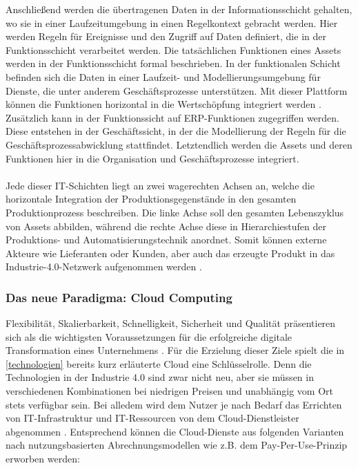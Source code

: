 Anschließend werden die übertragenen Daten in der Informationsschicht gehalten, wo sie in einer Laufzeitumgebung in einen Regelkontext gebracht werden. Hier werden Regeln für Ereignisse und den Zugriff auf Daten definiert, die in der Funktionsschicht verarbeitet werden. Die tatsächlichen Funktionen eines Assets werden in der Funktionsschicht formal beschrieben. In der funktionalen Schicht befinden sich die Daten in einer Laufzeit- und Modellierungsumgebung für Dienste, die unter anderem Geschäftsprozesse unterstützen. Mit dieser Plattform können die Funktionen horizontal in die Wertschöpfung integriert werden \citep{Huebner2017}. Zusätzlich kann in der Funktionssicht auf ERP-Funktionen zugegriffen werden. Diese entstehen in der Geschäftssicht, in der die Modellierung der Regeln für die Geschäftsprozessabwicklung stattfindet. Letztendlich werden die Assets und deren Funktionen hier in die Organisation und Geschäftsprozesse integriert.
\\\\
Jede dieser IT-Schichten liegt an zwei wagerechten Achsen an, welche die horizontale Integration der Produktionsgegenstände in den gesamten Produktionprozess beschreiben. Die linke Achse soll den gesamten Lebenszyklus von Assets abbilden, während die rechte Achse diese in Hierarchiestufen der Produktions- und Automatisierungstechnik anordnet. Somit können externe Akteure wie Lieferanten oder Kunden, aber auch das erzeugte Produkt in das Industrie-4.0-Netzwerk aufgenommen werden \citep{BITKOM2015}.


\subsubsection{Das neue Paradigma: Cloud Computing} \label{cloud}

Flexibilität, Skalierbarkeit, Schnelligkeit, Sicherheit und Qualität präsentieren sich als die wichtigsten Voraussetzungen für die erfolgreiche digitale Transformation eines Unternehmens \citep{Acharya2019}. Für die Erzielung dieser Ziele spielt die in \ref{technologien} bereits kurz erläuterte Cloud eine Schlüsselrolle. Denn die Technologien in der Industrie 4.0 sind zwar nicht neu, aber sie müssen in verschiedenen Kombinationen bei niedrigen Preisen und unabhängig vom Ort stets verfügbar sein. Bei alledem wird dem Nutzer je nach Bedarf das Errichten von IT-Infrastruktur und IT-Ressourcen von dem Cloud-Dienstleister abgenommen \citep{Dzombeta2017}. Entsprechend können die Cloud-Dienste aus folgenden Varianten nach nutzungsbasierten Abrechnungsmodellen wie z.B. dem Pay-Per-Use-Prinzip erworben werden:

